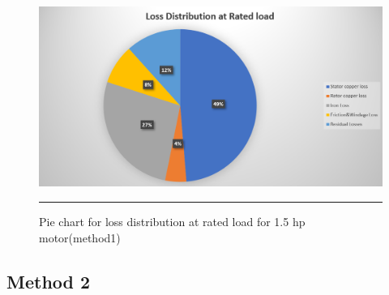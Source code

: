 \begin{figure}[hbtp!]
	\centering
		\includegraphics[width = 4.5in]{./Figures/MS/fig518.png}
		\rule{35em}{0.5pt}
	\caption{Pie chart for loss distribution at rated load for 1.5 hp motor(method1)}
	\label{fig:Pie chart for loss distribution at rated load for 1.5 hp motor(method1)} 
\end{figure}

\clearpage
\subsection{Method 2}
